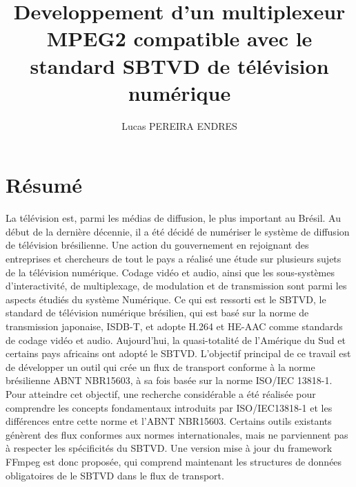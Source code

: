 \documentclass[12pt,a4paper]{article}
\author{Lucas PEREIRA ENDRES}
\title{Developpement d'un multiplexeur MPEG2 compatible avec le standard SBTVD de télévision numérique}
\begin{document}
\TBfrontcover
\newpage
 
\newpage
\section*{Résumé}
La télévision est, parmi les médias de diffusion, le plus important au Brésil. Au début de la dernière décennie, il a été décidé de numériser le système de diffusion de télévision brésilienne. Une action du gouvernement en rejoignant des entreprises et chercheurs de tout le pays a réalisé une étude sur plusieurs sujets de la télévision
numérique. Codage vidéo et audio, ainsi que les sous-systèmes d’interactivité, de multiplexage, de modulation et de transmission sont parmi les aspects étudiés du
système Numérique. Ce qui est ressorti est le SBTVD, le standard de télévision numérique brésilien, qui est basé sur la norme de transmission japonaise, ISDB-T, et
adopte H.264 et HE-AAC comme standards de codage vidéo et audio. Aujourd’hui, la quasi-totalité de l’Amérique du Sud et certains pays africains ont adopté le SBTVD.
L’objectif principal de ce travail est de développer un outil qui crée un flux de transport conforme à la norme brésilienne ABNT NBR15603, à sa fois basée sur la
norme ISO/IEC 13818-1. Pour atteindre cet objectif, une recherche considérable a été réalisée pour comprendre les concepts fondamentaux introduits par ISO/IEC13818-1
et les différences entre cette norme et l’ABNT NBR15603. Certains outils existants génèrent des flux conformes aux normes internationales, mais ne parviennent pas à respecter les spécificités du SBTVD. Une version mise à jour du framework FFmpeg est donc proposée, qui comprend maintenant les structures de données obligatoires
de le SBTVD dans le flux de transport.

\end{document}
